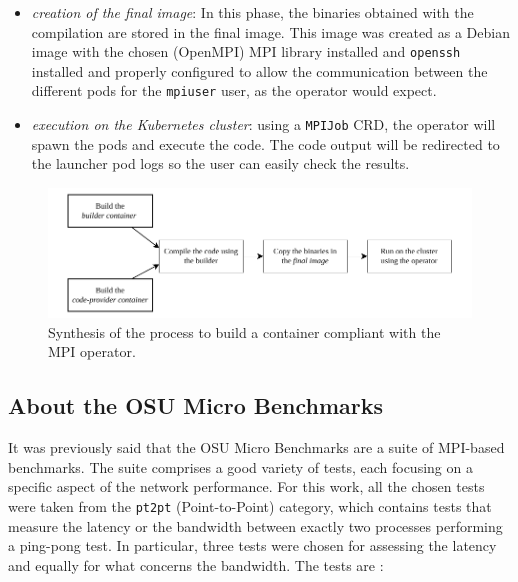 \begin{itemize}
  \item \textit{creation of the final image}: In this phase, the binaries
    obtained with the compilation are stored in the final image. This image was
    created as a Debian image with the chosen (OpenMPI) MPI library installed
    and \texttt{openssh} installed and properly configured to allow the
    communication between the different pods for the \texttt{mpiuser} user, as
    the operator would expect.

  \item \textit{execution on the Kubernetes cluster}: using a \texttt{MPIJob}
    CRD, the operator will spawn the pods and execute the code. The code output
    will be redirected to the launcher pod logs so the user can easily check the
    results.
\end{itemize}


\begin{figure}
  \centering
  \includegraphics[width=\textwidth]{img/chpt3/mpi-container-building}
  \caption{Synthesis of the process to build a container compliant with the MPI
    operator.}
  \label{fig:mpi-container-creation}
\end{figure}


\subsection{About the OSU Micro Benchmarks}

It was previously said that the OSU Micro Benchmarks are a suite of MPI-based
benchmarks. The suite comprises a good variety of tests, each focusing on a
specific aspect of the network performance.
For this work, all the chosen tests were taken from the \texttt{pt2pt}
(Point-to-Point) category, which contains tests that measure the latency or the
bandwidth between exactly two processes performing a ping-pong test.
In particular, three tests were chosen for assessing the latency and equally for
what concerns the bandwidth. The tests are \cite{osu}:

